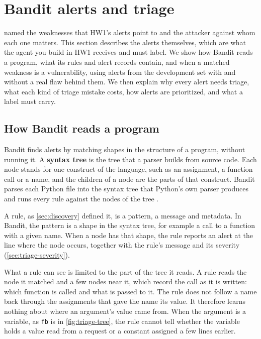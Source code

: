 \section{Bandit alerts and triage}
\label{sec:triage}

 named the weaknesses that HW1's alerts point to and the attacker against whom
each one matters. This section describes the alerts themselves, which are what the agent you build in
HW1 receives and must label. We show how Bandit reads a program, what its rules and alert records
contain, and when a matched weakness is a vulnerability, using alerts from the development set with
and without a real flaw behind them. We then explain why every alert needs triage, what each kind of
triage mistake costs, how alerts are prioritized, and what a label must carry.

\subsection{How Bandit reads a program}
\label{sec:triage-tree}

Bandit finds alerts by matching shapes in the structure of a program, without running it. A
\textbf{syntax tree} is the tree that a parser builds from source code. Each node stands for one
construct of the language, such as an assignment, a function call or a name, and the children of a
node are the parts of that construct. Bandit parses each Python file into the syntax tree that
Python's own parser produces \citep{python-ast} and runs every rule against the nodes of the tree
\citep{bandit}.

A rule, as \cref{sec:discovery} defined it, is a pattern, a message and metadata. In Bandit, the
pattern is a shape in the syntax tree, for example a call to a function with a given name. When a
node has that shape, the rule reports an alert at the line where the node occurs, together with the
rule's message and its severity (\cref{sec:triage-severity}).

What a rule can see is limited to the part of the tree it reads. A rule reads the node it matched and
a few nodes near it, which record the call as it is written: which function is called and what is
passed to it. The rule does not follow a name back through the assignments that gave the name its
value. It therefore learns nothing about where an argument's value came from. When the argument is a
variable, as \texttt{fb} is in \cref{fig:triage-tree}, the rule cannot tell whether the variable holds
a value read from a request or a constant assigned a few lines earlier.

